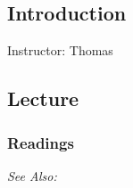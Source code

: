 \documentclass[11pt,a4paper]{article}
\newcommand{\thomas}{\vspace{1em}\noindent Instructor: Thomas\\}
\newcommand{\seealso}{\noindent \emph{See Also:}}
\begin{document}
\secttoc

\clearpage

\subsection{Introduction}
\emph{}

\thomas

\subsection*{Lecture}

\begin{itemize*}
\item 
\end{itemize*}

\subsubsection*{Readings}

\seealso





\end{document}
